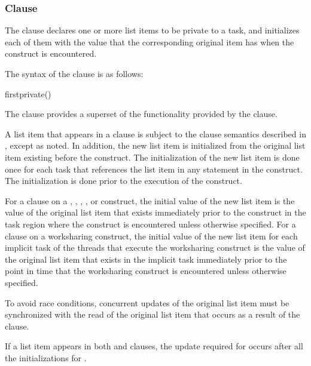 \vspace{-12 pt} %
\subsubsection{ Clause}
\label{subsubsec:firstprivate clause}
\summary
The  clause declares one or more list items to be private to a task, and
initializes each of them with the value that the corresponding original item has when the
construct is encountered.

\syntax
The syntax of the  clause is as follows:

\begin{ompSyntax}
firstprivate()
\end{ompSyntax}

\descr
The  clause provides a superset of the functionality provided by the
 clause.

A list item that appears in a  clause is subject to the  clause
semantics described in
,
except as noted. In addition, the
new list item is initialized from the original list item existing before the construct. The
initialization of the new list item is done once for each task that references the list item
in any statement in the construct. The initialization is done prior to the execution of the
construct.

For a  clause on a , ,
, , or  construct, the initial
value of the new list item is the value of the original list item that
exists immediately prior to the construct in the task region where the
construct is encountered unless otherwise specified. For a
 clause on a worksharing construct, the initial
value of the new list item for each implicit task of the threads that
execute the worksharing construct is the value of the original list
item that exists in the implicit task immediately prior to the point
in time that the worksharing construct is encountered unless otherwise
specified.

To avoid race conditions, concurrent updates of the original list item must be
synchronized with the read of the original list item that occurs as a result of the
 clause.

If a list item appears in both  and  clauses, the update
required for  occurs after all the initializations for .

